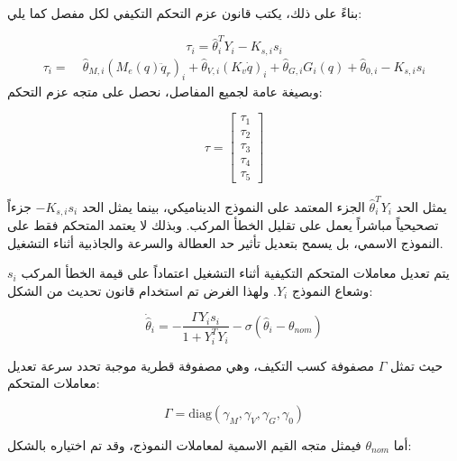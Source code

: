 بناءً على ذلك، يكتب قانون عزم التحكم التكيفي لكل مفصل كما يلي:

\begin{equation}
\tau_i
=
\hat{\theta}_i^{T}Y_i
-
K_{s,i}s_i
\label{eq:actc_adaptive_torque_single_joint}
\end{equation}
\begin{equation}
\begin{aligned}
\tau_i
=&\;
\hat{\theta}_{M,i}
\left(M_e(q)\ddot{q}_r\right)_i
+
\hat{\theta}_{V,i}
\left(K_v\dot{q}\right)_i
+
\hat{\theta}_{G,i}
G_i(q)
+
\hat{\theta}_{0,i}
-
K_{s,i}s_i
\end{aligned}
\label{eq:actc_adaptive_torque_expanded}
\end{equation}
وبصيغة عامة لجميع المفاصل، نحصل على متجه عزم التحكم:

\begin{equation}
\tau
=
\begin{bmatrix}
\tau_1\\
\tau_2\\
\tau_3\\
\tau_4\\
\tau_5
\end{bmatrix}
\label{eq:actc_adaptive_torque_vector}
\end{equation}

يمثل الحد \(\hat{\theta}_i^{T}Y_i\) الجزء المعتمد على النموذج الديناميكي، بينما يمثل الحد \(-K_{s,i}s_i\) جزءاً تصحيحياً مباشراً يعمل على تقليل الخطأ المركب. وبذلك لا يعتمد المتحكم فقط على النموذج الاسمي، بل يسمح بتعديل تأثير حد العطالة والسرعة والجاذبية أثناء التشغيل.

يتم تعديل معاملات المتحكم التكيفية أثناء التشغيل اعتماداً على قيمة الخطأ المركب \(s_i\) وشعاع النموذج \(Y_i\). ولهذا الغرض تم استخدام قانون تحديث من الشكل:

\begin{equation}
\dot{\hat{\theta}}_i
=
-
\frac{\Gamma Y_i s_i}{1+Y_i^{T}Y_i}
-
\sigma
\left(
\hat{\theta}_i-\theta_{nom}
\right)
\label{eq:actc_adaptation_law}
\end{equation}

حيث تمثل \(\Gamma\) مصفوفة كسب التكيف، وهي مصفوفة قطرية موجبة تحدد سرعة تعديل معاملات المتحكم:

\begin{equation}
\Gamma=
\mathrm{diag}
\left(
\gamma_M,
\gamma_V,
\gamma_G,
\gamma_0
\right)
\label{eq:actc_gamma_matrix}
\end{equation}

أما \(\theta_{nom}\) فيمثل متجه القيم الاسمية لمعاملات النموذج، وقد تم اختياره بالشكل:

